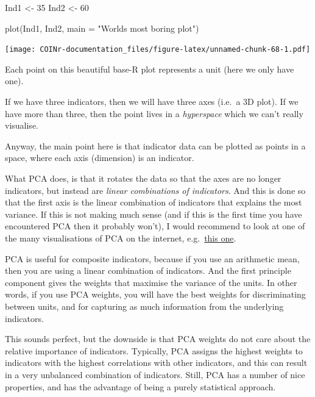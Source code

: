 \documentclass[
]{book}
\newenvironment{Shaded}{\begin{snugshade}}{\end{snugshade}}
\newcommand{\AttributeTok}[1]{\textcolor[rgb]{0.77,0.63,0.00}{#1}}
\newcommand{\DecValTok}[1]{\textcolor[rgb]{0.00,0.00,0.81}{#1}}
\newcommand{\FunctionTok}[1]{\textcolor[rgb]{0.00,0.00,0.00}{#1}}
\newcommand{\NormalTok}[1]{#1}
\newcommand{\OtherTok}[1]{\textcolor[rgb]{0.56,0.35,0.01}{#1}}
\newcommand{\StringTok}[1]{\textcolor[rgb]{0.31,0.60,0.02}{#1}}
\begin{document}
\begin{Shaded}
\begin{Highlighting}[]
\NormalTok{Ind1 }\OtherTok{\textless{}{-}} \DecValTok{35}
\NormalTok{Ind2 }\OtherTok{\textless{}{-}} \DecValTok{60}

\FunctionTok{plot}\NormalTok{(Ind1, Ind2, }\AttributeTok{main =} \StringTok{"World\textquotesingle{}s most boring plot"}\NormalTok{)}
\end{Highlighting}
\end{Shaded}

\texttt{[image: COINr-documentation\_files/figure-latex/unnamed-chunk-68-1.pdf]}

Each point on this beautiful base-R plot represents a unit (here we only have one).

If we have three indicators, then we will have three axes (i.e.~a 3D plot). If we have more than three, then the point lives in a \emph{hyperspace} which we can't really visualise.

Anyway, the main point here is that indicator data can be plotted as points in a space, where each axis (dimension) is an indicator.

What PCA does, is that it rotates the data so that the axes are no longer indicators, but instead are \emph{linear combinations of indicators}. And this is done so that the first axis is the linear combination of indicators that explains the most variance. If this is not making much sense (and if this is the first time you have encountered PCA then it probably won't), I would recommend to look at one of the many visualisations of PCA on the internet, e.g.~\href{https://setosa.io/ev/principal-component-analysis/}{this one}.

PCA is useful for composite indicators, because if you use an arithmetic mean, then you are using a linear combination of indicators. And the first principle component gives the weights that maximise the variance of the units. In other words, if you use PCA weights, you will have the best weights for discriminating between units, and for capturing as much information from the underlying indicators.

This sounds perfect, but the downside is that PCA weights do not care about the relative importance of indicators. Typically, PCA assigns the highest weights to indicators with the highest correlations with other indicators, and this can result in a very unbalanced combination of indicators. Still, PCA has a number of nice properties, and has the advantage of being a purely statistical approach.
\end{document}
